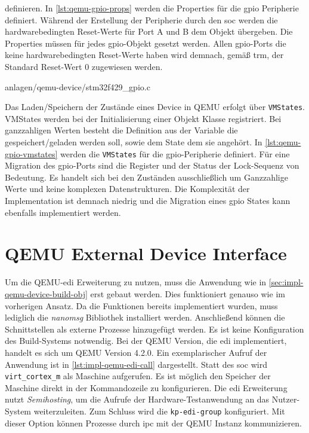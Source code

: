 definieren.
In \ref{lst:qemu-gpio-props} werden die Properties für die \ac{gpio} Peripherie
definiert.
\newline
Während der Erstellung der Peripherie durch den \ac{soc} werden die
hardwarebedingten Reset-Werte für Port A und B dem Objekt übergeben.
Die Properties müssen für jedes \ac{gpio}-Objekt gesetzt werden.
Allen \ac{gpio}-Ports die keine hardwarebedingten Reset-Werte haben wird
demnach, gemäß \ac{trm}, der Standard Reset-Wert 0 zugewiesen werden.
\newline
\begin{minipage}{\linewidth}

                {anlagen/qemu-device/stm32f429_gpio.c}
\end{minipage}

Das Laden/Speichern der Zustände eines Device in QEMU erfolgt über
\texttt{VMStates}.
VMStates werden bei der Initialisierung einer Objekt Klasse registriert.
Bei ganzzahligen Werten besteht die Definition aus der Variable die
gespeichert/geladen werden soll, sowie dem State dem sie angehört.
In \ref{lst:qemu-gpio-vmstates} werden die \texttt{VMStates} für die
\ac{gpio}-Peripherie definiert. 
Für eine Migration des \ac{gpio}-Ports sind die Register und der Status der
Lock-Sequenz von Bedeutung.
\newline
Es handelt sich bei den Zuständen ausschließlich um Ganzzahlige Werte und keine
komplexen Datenstrukturen.
Die Komplexität der Implementation ist demnach niedrig und die Migration eines
\ac{gpio} States kann ebenfalls implementiert werden.

\section{QEMU External Device Interface}

Um die QEMU-\ac{edi} Erweiterung zu nutzen, muss die Anwendung wie in
\ref{sec:impl-qemu-device-build-obj} erst gebaut werden.
Dies funktioniert genauso wie im vorherigen Ansatz.
Da die Funktionen bereits implementiert wurden, muss lediglich die
\textit{nanomsg} Bibliothek installiert werden.
Anschließend können die Schnittstellen als externe Prozesse hinzugefügt werden.
Es ist keine Konfiguration des Build-Systems notwendig.
Bei der QEMU Version, die \ac{edi} implementiert, handelt es sich um QEMU
Version 4.2.0.
Ein exemplarischer Aufruf der Anwendung ist in \ref{lst:impl-qemu-edi-call}
dargestellt.
\newline
Statt des \ac{soc} wird \texttt{virt\_cortex\_m} als Maschine aufgerufen.
Es ist möglich den Speicher der Maschine direkt in der Kommandozeile zu
konfigurieren.
Die \ac{edi} Erweiterung nutzt \textit{Semihosting}, um die Aufrufe der
Hardware-Testanwendung an das Nutzer-System weiterzuleiten.
Zum Schluss wird die \texttt{kp-edi-group} konfiguriert.
Mit dieser Option können Prozesse durch \ac{ipc} mit der QEMU Instanz
kommunizieren.


